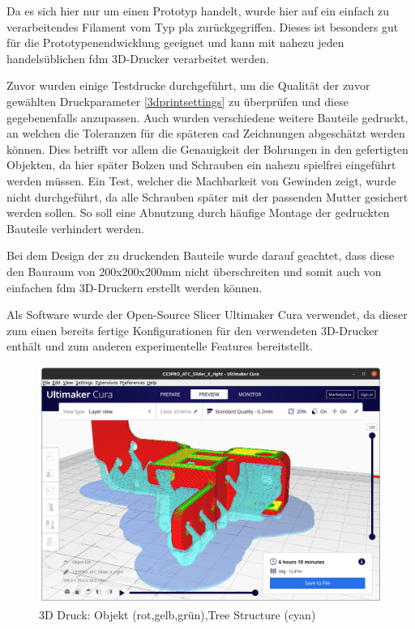 Da es sich hier nur um einen Prototyp handelt, wurde hier auf ein
einfach zu verarbeitendes Filament vom Typ \gls{pla} zurückgegriffen.
Dieses ist besonders gut für die Prototypenendwicklung geeignet und kann
mit nahezu jeden handelsüblichen \gls{fdm} 3D-Drucker verarbeitet
werden.

Zuvor wurden einige Testdrucke durchgeführt, um die Qualität der zuvor
gewählten Druckparameter \ref{3dprintsettings} zu überprüfen und diese
gegebenenfalls anzupassen. Auch wurden verschiedene weitere Bauteile
gedruckt, an welchen die Toleranzen für die späteren \gls{cad}
Zeichnungen abgeschätzt werden können. Dies betrifft vor allem die
Genauigkeit der Bohrungen in den gefertigten Objekten, da hier später
Bolzen und Schrauben ein nahezu spielfrei eingeführt werden müssen. Ein
Test, welcher die Machbarkeit von Gewinden zeigt, wurde nicht
durchgeführt, da alle Schrauben später mit der passenden Mutter
gesichert werden sollen. So soll eine Abnutzung durch häufige Montage
der gedruckten Bauteile verhindert werden.

Bei dem Design der zu druckenden Bauteile wurde darauf geachtet, dass
diese den Bauraum von 200x200x200mm nicht überschreiten und somit auch
von einfachen \gls{fdm} 3D-Druckern erstellt werden können.

Als Software wurde der Open-Source Slicer Ultimaker Cura
\cite{ultimakercura} verwendet, da dieser zum einen bereits fertige
Konfigurationen für den verwendeten 3D-Drucker enthält und zum anderen
experimentelle Features bereitstellt.

\begin{figure}
\centering
\includegraphics{images/3d_print_tree_structure.png}
\caption{3D Druck: Objekt (rot,gelb,grün),Tree Structure (cyan)
\label{3d_print_tree_structure}}
\end{figure}

